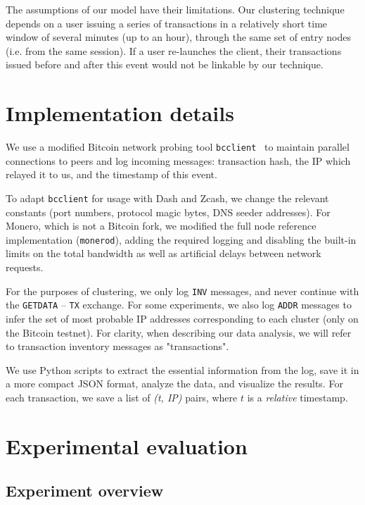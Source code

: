 The assumptions of our model have their limitations.
Our clustering technique depends on a user issuing a series of transactions in a relatively short time window of several minutes (up to an hour), through the same set of entry nodes (i.e. from the same session).
If a user re-launches the client, their transactions issued before and after this event would not be linkable by our technique.


\section{Implementation details}

We use a modified Bitcoin network probing tool \texttt{bcclient}~\cite{Pustogarov2017} to maintain parallel connections to peers and log incoming messages: transaction hash, the IP which relayed it to us, and the timestamp of this event.

To adapt \texttt{bcclient} for usage with Dash and Zcash, we change the relevant constants (port numbers, protocol magic bytes, DNS seeder addresses).
For Monero, which is not a Bitcoin fork, we modified the full node reference implementation (\texttt{monerod}), adding the required logging and disabling the built-in limits on the total bandwidth as well as artificial delays between network requests.

For the purposes of clustering, we only log \texttt{INV} messages, and never continue with the \texttt{GETDATA} -- \texttt{TX} exchange.
For some experiments, we also log \texttt{ADDR} messages to infer the set of most probable IP addresses corresponding to each cluster (only on the Bitcoin testnet).
For clarity, when describing our data analysis, we will refer to transaction inventory messages as "transactions".

We use Python scripts to extract the essential information from the log, save it in a more compact JSON format, analyze the data, and visualize the results.
For each transaction, we save a list of \textit{(t, IP)} pairs, where $t$ is a \textit{relative} timestamp.

\section{Experimental evaluation}

\subsection{Experiment overview}

